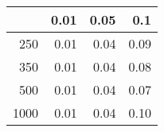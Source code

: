 % 
\begin{tabular}{rrrr}
  \hline
 & 0.01 & 0.05 & 0.1 \\ 
  \hline
250 & 0.01 & 0.04 & 0.09 \\ 
  350 & 0.01 & 0.04 & 0.08 \\ 
  500 & 0.01 & 0.04 & 0.07 \\ 
  1000 & 0.01 & 0.04 & 0.10 \\ 
   \hline
\end{tabular}
